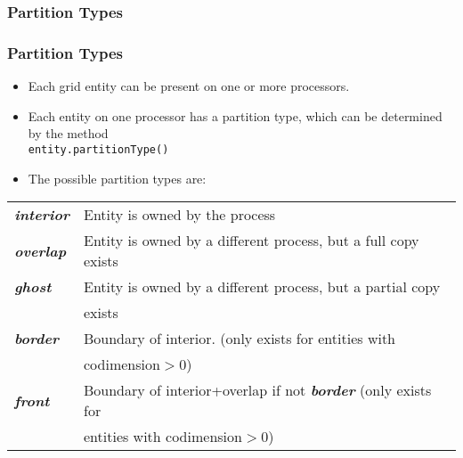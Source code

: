 \subsubsection{Partition Types}
\begin{frame}[fragile]
\frametitle<presentation>{Partition Types}

\begin{itemize}
\item Each grid entity can be present on one or more processors.
\item Each entity on one processor has a partition type, which can be determined
by the method\\
        \hspace*{1cm}\lstinline!entity.partitionType()!
\item The possible partition types are:\\
\end{itemize}
\begin{tabular}{ll}
  \em \bfseries interior
  & Entity is owned by the process\\
  \em \bfseries overlap & Entity is owned by a different process, but a full copy exists\\
  \em \bfseries ghost
  & Entity is owned by a different process, but a partial copy\\
  & exists\\
  \em \bfseries border
  & Boundary of interior. (only exists for entities with \\
  & codimension$>$0)\\
  \em \bfseries front
  & Boundary of interior+overlap if not {\em \bfseries border} (only exists for\\
  & entities with codimension$>$0)
\end{tabular}
\end{frame}


